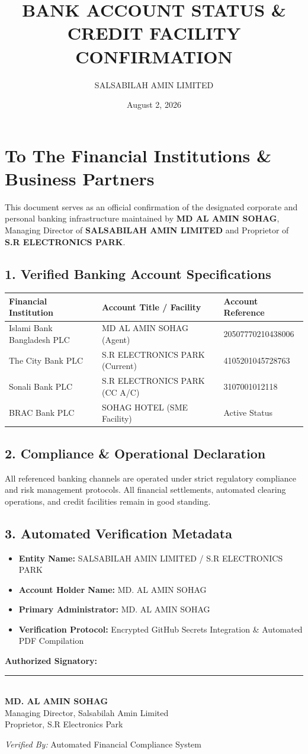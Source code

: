 \documentclass[11pt,a4paper]{article}
\title{\textbf{BANK ACCOUNT STATUS \& CREDIT FACILITY CONFIRMATION}}
\author{SALSABILAH AMIN LIMITED}
\date{August 2, 2026}
\begin{document}
\maketitle

\section*{To The Financial Institutions \& Business Partners}
This document serves as an official confirmation of the designated corporate and personal banking infrastructure maintained by \textbf{MD AL AMIN SOHAG}, Managing Director of \textbf{SALSABILAH AMIN LIMITED} and Proprietor of \textbf{S.R ELECTRONICS PARK}.

\subsection*{1. Verified Banking Account Specifications}
\begin{center}
\begin{tabular}{|l|l|l|}
\hline
\textbf{Financial Institution} & \textbf{Account Title / Facility} & \textbf{Account Reference} \\
\hline
Islami Bank Bangladesh PLC & MD AL AMIN SOHAG (Agent) & 20507770210438006 \\
The City Bank PLC & S.R ELECTRONICS PARK (Current) & 4105201045728763 \\
Sonali Bank PLC & S.R ELECTRONICS PARK (CC A/C) & 3107001012118 \\
BRAC Bank PLC & SOHAG HOTEL (SME Facility) & Active Status \\
\hline
\end{tabular}
\end{center}

\subsection*{2. Compliance \& Operational Declaration}
All referenced banking channels are operated under strict regulatory compliance and risk management protocols. All financial settlements, automated clearing operations, and credit facilities remain in good standing.

\subsection*{3. Automated Verification Metadata}
\begin{itemize}
    \item \textbf{Entity Name:} SALSABILAH AMIN LIMITED / S.R ELECTRONICS PARK
    \item \textbf{Account Holder Name:} MD. AL AMIN SOHAG
    \item \textbf{Primary Administrator:} MD. AL AMIN SOHAG
    \item \textbf{Verification Protocol:} Encrypted GitHub Secrets Integration & Automated PDF Compilation
\end{itemize}

\vspace{2cm}
\noindent
\textbf{Authorized Signatory:}\\[1.5cm]
\rule{6cm}{0.4pt}\\
\textbf{MD. AL AMIN SOHAG}\\
Managing Director, Salsabilah Amin Limited\\
Proprietor, S.R Electronics Park

\vspace{1cm}
\noindent
\textit{Verified By:} Automated Financial Compliance System
\end{document}
